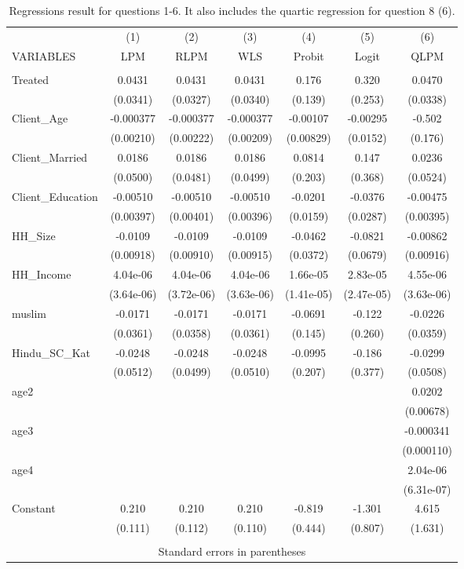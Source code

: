 \documentclass{article}
\theoremstyle{definition}
\begin{document}
\begin{table}[htbp]\centering
\begin{tabular}{lcccccc} \hline
 & (1) & (2) & (3) & (4) & (5) & (6) \\
VARIABLES & LPM & RLPM & WLS & Probit & Logit & QLPM \\ \hline
 &  &  &  &  &  &  \\
Treated & 0.0431 & 0.0431 & 0.0431 & 0.176 & 0.320 & 0.0470 \\
 & (0.0341) & (0.0327) & (0.0340) & (0.139) & (0.253) & (0.0338) \\
Client\_Age & -0.000377 & -0.000377 & -0.000377 & -0.00107 & -0.00295 & -0.502 \\
 & (0.00210) & (0.00222) & (0.00209) & (0.00829) & (0.0152) & (0.176) \\

Client\_Married & 0.0186 & 0.0186 & 0.0186 & 0.0814 & 0.147 & 0.0236 \\
 & (0.0500) & (0.0481) & (0.0499) & (0.203) & (0.368) & (0.0524) \\
Client\_Education & -0.00510 & -0.00510 & -0.00510 & -0.0201 & -0.0376 & -0.00475 \\
 & (0.00397) & (0.00401) & (0.00396) & (0.0159) & (0.0287) & (0.00395) \\
HH\_Size & -0.0109 & -0.0109 & -0.0109 & -0.0462 & -0.0821 & -0.00862 \\
 & (0.00918) & (0.00910) & (0.00915) & (0.0372) & (0.0679) & (0.00916) \\
HH\_Income & 4.04e-06 & 4.04e-06 & 4.04e-06 & 1.66e-05 & 2.83e-05 & 4.55e-06 \\
 & (3.64e-06) & (3.72e-06) & (3.63e-06) & (1.41e-05) & (2.47e-05) & (3.63e-06) \\
muslim & -0.0171 & -0.0171 & -0.0171 & -0.0691 & -0.122 & -0.0226 \\
 & (0.0361) & (0.0358) & (0.0361) & (0.145) & (0.260) & (0.0359) \\
Hindu\_SC\_Kat & -0.0248 & -0.0248 & -0.0248 & -0.0995 & -0.186 & -0.0299 \\
 & (0.0512) & (0.0499) & (0.0510) & (0.207) & (0.377) & (0.0508) \\
 age2 &  &  &  &  &  & 0.0202 \\
 &  &  &  &  &  & (0.00678) \\
age3 &  &  &  &  &  & -0.000341 \\
 &  &  &  &  &  & (0.000110) \\
age4 &  &  &  &  &  & 2.04e-06 \\
 &  &  &  &  &  & (6.31e-07) \\
Constant & 0.210 & 0.210 & 0.210 & -0.819 & -1.301 & 4.615 \\
 & (0.111) & (0.112) & (0.110) & (0.444) & (0.807) & (1.631) \\
 &  &  &  &  &  &  \\ \hline
\multicolumn{7}{c}{ Standard errors in parentheses} \\
\end{tabular}
\caption{Regressions result for questions 1-6. It also includes the quartic regression for question 8 (6).  }
\end{table}
\end{document}
